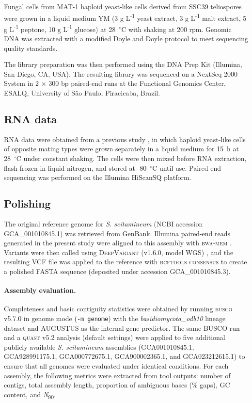 \documentclass[Journal,letterpaper]{ascelike-new}
\begin{document}
Fungal cells from MAT-1 haploid yeast-like cells derived from SSC39
teliospores were grown in a liquid medium YM (3 g
  L\textsuperscript{-1} yeast extract, 3 g L\textsuperscript{-1} malt
  extract, 5 g L\textsuperscript{-1} peptone, 10 g
L\textsuperscript{-1} glucose) at 28~$^{\circ}$C with shaking at 200
rpm. Genomic DNA was extracted with a modified Doyle and Doyle
protocol \cite{Doyle1987} to meet sequencing quality standards.

The library preparation was then performed using the DNA Prep Kit
(Illumina, San Diego, CA, USA). The resulting library was sequenced
on a NextSeq 2000 System in 2 $\times$ 300 bp paired-end runs at the
Functional Genomics Center, ESALQ, University of São Paulo, Piracicaba, Brazil.

\subsection*{RNA data}

RNA data were obtained from a previous study \cite{sscita2015}, in
which haploid yeast-like cells of opposite mating types were grown
separately in a liquid medium for 15~h at 28~$^{\circ}$C under
constant shaking. The cells were then mixed before RNA extraction,
flash-frozen in liquid nitrogen, and stored at -80~$^{\circ}$C until
use. Paired-end sequencing was performed on the Illumina HiScanSQ platform.

\subsection*{Polishing}

The original reference genome for \textit{S. scitamineum} (NCBI
accession GCA\_001010845.1) \cite{sscita2015} was retrieved from
GenBank. Illumina paired-end reads generated in the present study
were aligned to this assembly with \textsc{bwa-mem} \cite{bwamem}.
Variants were then called using \textsc{DeepVariant} (v1.6.0, model
WGS) \cite{deepvariant2018}, and the resulting VCF file was
applied to the reference with \textsc{bcftools consensus}
\cite{samtools} to create a polished FASTA sequence (deposited under
accession GCA\_001010845.3).

\paragraph{Assembly evaluation.} Completeness and basic contiguity
statistics were obtained by running \textsc{busco} v5.7.0
\cite{busco} in genome mode (\texttt{-m genome}) with the
\textit{basidiomycota\_odb10} lineage dataset and \textsc{AUGUSTUS}
as the internal gene predictor. The same BUSCO run and a
\textsc{quast} v5.2 analysis (default settings) were applied to five
additional publicly available \textit{S. scitamineum} assemblies
(GCA001010845.1, GCA928991175.1, GCA000772675.1, GCA900002365.1, and
GCA023212615.1) to ensure that all genomes were evaluated under
identical conditions. For each assembly, the following metrics were
extracted from tool outputs: number of contigs, total assembly
length, proportion of ambiguous bases (\% gaps), GC content, and
\textit{N}\textsubscript{90}.
\end{document}
